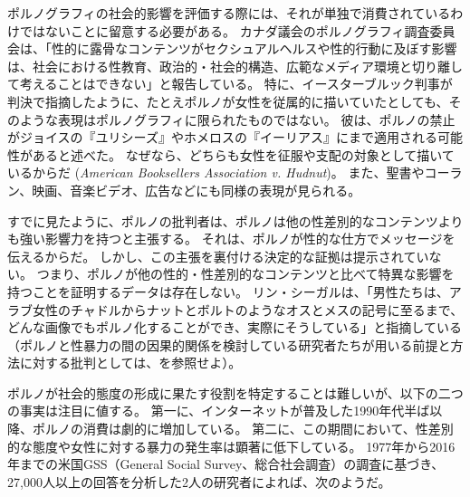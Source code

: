 \documentclass[paper=a4,book,openany]{jlreq}
\begin{document}
ポルノグラフィの社会的影響を評価する際には、それが単独で消費されているわけではないことに留意する必要がある。
カナダ議会のポルノグラフィ調査委員会は、「性的に露骨なコンテンツがセクシュアルヘルスや性的行動に及ぼす影響は、社会における性教育、政治的・社会的構造、広範なメディア環境と切り離して考えることはできない」と報告している\citep[p.11]{committee17:_repor_public_healt_effec_ease}。
特に、イースターブルック判事が判決で指摘したように、たとえポルノが女性を従属的に描いていたとしても、そのような表現はポルノグラフィに限られたものではない。
彼は、ポルノの禁止がジョイスの『ユリシーズ』やホメロスの『イーリアス』にまで適用される可能性があると述べた。
なぜなら、どちらも女性を征服や支配の対象として描いているからだ
(\emph{American Booksellers Association v. Hudnut})。
また、聖書やコーラン、映画、音楽ビデオ、広告などにも同様の表現が見られる。

すでに見たように、ポルノの批判者は、ポルノは他の性差別的なコンテンツよりも強い影響力を持つと主張する。
それは、ポルノが性的な仕方でメッセージを伝えるからだ。
しかし、この主張を裏付ける決定的な証拠は提示されていない。
つまり、ポルノが他の性的・性差別的なコンテンツと比べて特異な影響を持つことを証明するデータは存在しない。
リン・シーガルは、「男性たちは、アラブ女性のチャドルからナットとボルトのようなオスとメスの記号に至るまで、どんな画像でもポルノ化することができ、実際にそうしている」と指摘している
（ポルノと性暴力の間の因果的関係を検討している研究者たちが用いる前提と方法に対する批判としては、\citet{boyle00:_pornog_debat}を参照せよ）\citep[p.15]{segal93:_does_pornog_cause_violen}。

ポルノが社会的態度の形成に果たす役割を特定することは難しいが、以下の二つの事実は注目に値する。
第一に、インターネットが普及した1990年代半ば以降、ポルノの消費は劇的に増加している。
第二に、この期間において、性差別的な態度や女性に対する暴力の発生率は顕著に低下している。
1977年から2016年までの米国GSS（General Social Survey、総合社会調査）の調査に基づき、27,000人以上の回答を分析した2人の研究者によれば、次のようだ。
\end{document}
